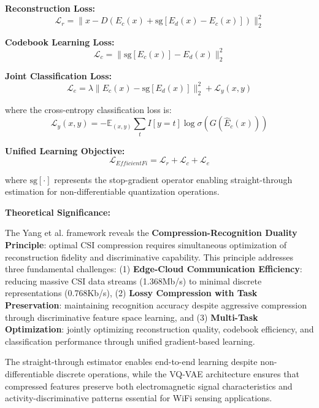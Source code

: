 \documentclass[journal]{IEEEtran}
\begin{document}
\textbf{Reconstruction Loss:}
\begin{equation}
\mathcal{L}_r = \|x - D(E_c(x) + \text{sg}[E_d(x) - E_c(x)])\|_2^2
\label{eq:yang_reconstruction}
\end{equation}

\textbf{Codebook Learning Loss:}
\begin{equation}
\mathcal{L}_c = \|\text{sg}[E_c(x)] - E_d(x)\|_2^2
\label{eq:yang_codebook}
\end{equation}

\textbf{Joint Classification Loss:}
\begin{equation}
\mathcal{L}_e = \lambda\|E_c(x) - \text{sg}[E_d(x)]\|_2^2 + \mathcal{L}_y(x, y)
\label{eq:yang_classification}
\end{equation}

where the cross-entropy classification loss is:
\begin{equation}
\mathcal{L}_y(x, y) = -\mathbb{E}_{(x,y)} \sum_t I[y = t] \log \sigma(G(\hat{E}_c(x)))
\label{eq:yang_crossentropy}
\end{equation}

\textbf{Unified Learning Objective:}
\begin{equation}
\mathcal{L}_{EfficientFi} = \mathcal{L}_r + \mathcal{L}_c + \mathcal{L}_e
\label{eq:yang_unified}
\end{equation}

where $\text{sg}[\cdot]$ represents the stop-gradient operator enabling straight-through estimation for non-differentiable quantization operations.

\textbf{Theoretical Significance:}

The Yang et al. framework reveals the \textbf{Compression-Recognition Duality Principle}: optimal CSI compression requires simultaneous optimization of reconstruction fidelity and discriminative capability. This principle addresses three fundamental challenges: (1) \textbf{Edge-Cloud Communication Efficiency}: reducing massive CSI data streams (1.368Mb/s) to minimal discrete representations (0.768Kb/s), (2) \textbf{Lossy Compression with Task Preservation}: maintaining recognition accuracy despite aggressive compression through discriminative feature space learning, and (3) \textbf{Multi-Task Optimization}: jointly optimizing reconstruction quality, codebook efficiency, and classification performance through unified gradient-based learning.

The straight-through estimator enables end-to-end learning despite non-differentiable discrete operations, while the VQ-VAE architecture ensures that compressed features preserve both electromagnetic signal characteristics and activity-discriminative patterns essential for WiFi sensing applications.
\end{document}

